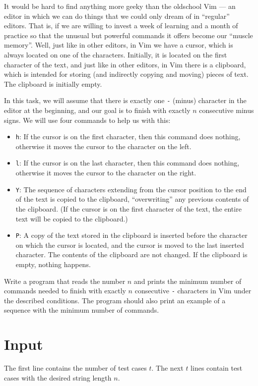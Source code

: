 
It would be hard to find anything more geeky than the oldschool Vim --- an
editor in which we can do things that we could only dream of in ``regular''
editors. That is, if we are willing to invest a week of learning and a month of
practice so that the unusual but powerful commands it offers become our ``muscle
memory''. Well, just like in other editors, in Vim we have a cursor, which is
always located on one of the characters. Initially, it is located on the first
character of the text, and just like in other editors, in Vim there is a
clipboard, which is intended for storing (and indirectly copying and moving)
pieces of text. The clipboard is initially empty.

In this task, we will assume that there is exactly one \texttt{-} (minus)
character in the editor at the beginning, and our goal is to finish with exactly
$n$ consecutive minus signs. We will use four commands to help us with this:
\begin{itemize}
  \item \texttt{h}: If the cursor is on the first character, then this command
        does nothing, otherwise it moves the cursor to the character on the
        left.
  \item \texttt{l}: If the cursor is on the last character, then this command
        does nothing, otherwise it moves the cursor to the character on the
        right.
  \item \texttt{Y}: The sequence of characters extending from the cursor
        position to the end of the text is copied to the clipboard,
        ``overwriting'' any previous contents of the clipboard. (If the cursor
        is on the first character of the text, the entire text will be copied to
        the clipboard.)
  \item \texttt{P}: A copy of the text stored in the clipboard is inserted
        before the character on which the cursor is located, and the cursor is
        moved to the last inserted character. The contents of the clipboard are
        not changed. If the clipboard is empty, nothing happens.
\end{itemize}

Write a program that reads the number $n$ and prints the minimum number of
commands needed to finish with exactly $n$ consecutive \texttt{-} characters in
Vim under the described conditions. The program should also print an example of
a sequence with the minimum number of commands.

\section*{Input}
The first line contains the number of test cases $t$. The next $t$ lines contain
test cases with the desired string length $n$.

